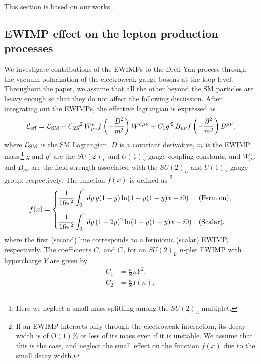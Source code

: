 \documentclass[12pt,twoside,book]{article}
\begin{document}
This section is based on our works \cite{Chigusa:2018vxz, Abe:2019egv}.


\subsection{EWIMP effect on the lepton production processes}
\label{sec:ewimp}

We investigate contributions of the EWIMPs to the Drell-Yan process
through the vacuum polarization of the electroweak gauge bosons at the
loop level. Throughout the paper, we assume that all the other beyond
the SM particles are heavy enough so that they do not affect the
following discussion.  After integrating out the EWIMPs, the effective
lagrangian is expressed as
\begin{align}
 \mathcal{L}_{\rm eff} = \mathcal{L}_{\rm SM} + C_2 g^2\, W_{\mu \nu}^a
 f\left(-\frac{D^2}{m^2}\right) W^{a\mu\nu} + C_1 g'^2\, B_{\mu\nu}
 f\left(-\frac{\partial^2}{m^2}\right) B^{\mu\nu},\label{eq_lag}
\end{align}
where $\mathcal{L}_{\rm SM}$ is the SM Lagrangian, $D$ is a covariant
derivative, $m$ is the EWIMP mass,\footnote{
Here we neglect a small mass splitting among the $SU(2)_L$ multiplet.
} $g$ and $g'$ are the
$SU(2)_L$ and $U(1)_Y$ gauge coupling constants, and $W_{\mu\nu}^a$
and $B_{\mu\nu}$ are the field strength associated with the $SU(2)_L$ and
$U(1)_Y$ gauge group, respectively.  The function $f(x)$ is defined as
\footnote{
  If an EWIMP interacts only through the electroweak interaction, its
  decay width is of $\mathrm{O}(1)\%$ or less of its mass even if it
  is unstable.  We assume that this is the case, and neglect the small
  effect on the function $f(x)$ due to the small decay width.
}
\begin{align}
 f(x) = \begin{cases}
	 \displaystyle{\frac{1}{16\pi^2} \int_0^1 dy\, y(1-y) \ln (1 -
	 y(1-y)x - i0)} & {\rm (Fermion)},\\[5mm]
	 \displaystyle{\frac{1}{16\pi^2} \int_0^1 dy\, (1-2y)^2 \ln (1-
	 y(1-y)x - i0)} & {\rm (Scalar)},
	\end{cases}\label{eq_f}
\end{align}
where the first (second) line corresponds to a fermionic (scalar) EWIMP, respectively.
The coefficients $C_1$ and $C_2$ for an $SU(2)_L$ $n$-plet EWIMP with hypercharge $Y$
are given by
\begin{align}
 C_1 &= \frac{\kappa}{8} n Y^2,\label{eq_C1}\\
 C_2 &= \frac{\kappa}{8} I(n),\label{eq_C2}
\end{align}
\end{document}
